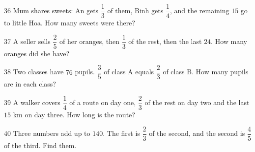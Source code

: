 \gap
\begin{probbox}{36}{}
Mum shares sweets: An gets $\dfrac13$ of them, Binh gets $\dfrac14$, and the remaining $15$ go to little Hoa. How many sweets were there?
\end{probbox}
\gap
\begin{probbox}{37}{}
A seller sells $\dfrac25$ of her oranges, then $\dfrac13$ of the rest, then the last $24$. How many oranges did she have?
\end{probbox}
\gap
\begin{probbox}{38}{}
Two classes have $76$ pupils. $\dfrac35$ of class A equals $\dfrac23$ of class B. How many pupils are in each class?
\end{probbox}
\gap
\begin{probbox}{39}{}
A walker covers $\dfrac14$ of a route on day one, $\dfrac23$ of the rest on day two and the last $15$ km on day three. How long is the route?
\end{probbox}
\gap
\begin{probbox}{40}{}
Three numbers add up to $140$. The first is $\dfrac23$ of the second, and the second is $\dfrac45$ of the third. Find them.
\end{probbox}
